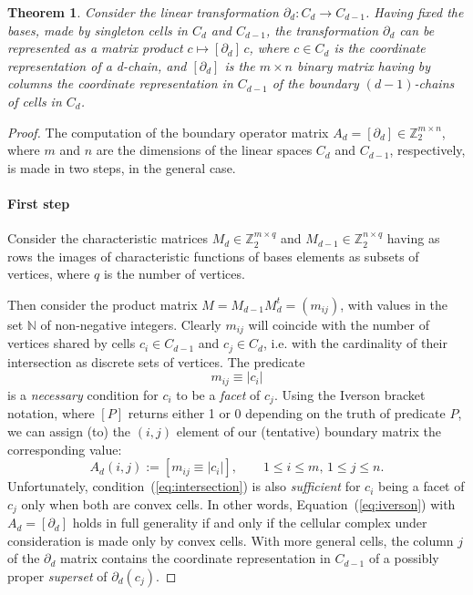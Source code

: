 \documentclass[11pt,oneside]{article}    %
\newtheorem{theorem}{Theorem}
\def\N{\mathbb{N}}
\def\Z{\mathbb{Z}}
\begin{document}
\begin{theorem}
Consider the linear transformation $\partial_d: C_d \to C_{d-1}$. Having fixed the bases, made by singleton cells in $C_d$ and $C_{d-1}$, the transformation $\partial_d$ can be represented as a matrix product ${c} \mapsto [\partial_d]\, {c}$, where ${c}\in C_d$ is the coordinate representation of a d-chain, and $[\partial_d]$ is the $m\times n$ binary matrix having \emph{by columns} the coordinate representation in $C_{d-1}$ of the boundary $(d-1)$-chains of cells in $C_{d}$.
\end{theorem}

\begin{proof}
The computation of the boundary operator matrix $A_d = [\partial_d] \in\Z_2^{m\times n}$, where $m$ and $n$ are the dimensions of the linear spaces $C_d$ and $C_{d-1}$, respectively, is made in two steps, in the general case.

\paragraph{First step} 
Consider the characteristic matrices $M_d\in\Z_2^{m\times q}$ and $M_{d-1}\in\Z_2^{n\times q}$ having as rows the images of characteristic functions of bases elements as subsets of vertices, where $q$ is the number of vertices.

Then consider the product matrix $M=M_{d-1}M_{d}^t=(m_{ij})$, with values in the set $\N$ of non-negative integers. Clearly $m_{ij}$ will coincide with the number of vertices shared by cells $c_i\in C_{d-1}$ and $c_j\in C_d$, i.e. with the cardinality of their intersection as discrete sets of vertices. The predicate 
\begin{equation}
m_{ij} \equiv |c_i|
\label{eq:intersection}
\end{equation}
is a \emph{necessary} condition for $c_i$ to be a \emph{facet} of $c_j$. Using the Iverson bracket notation, where $[P]$ returns either 1 or 0 depending on the truth of predicate $P$, we can  assign (to) the $(i,j)$ element of our (tentative) boundary matrix the corresponding value:
\begin{equation}
A_d(i,j) := [m_{ij} \equiv |c_i|], \qquad 1\leq i\leq m,\, 1\leq j\leq n.
\label{eq:iverson}
\end{equation}
Unfortunately, condition~(\ref{eq:intersection}) is also \emph{sufficient} for $c_i$ being a facet of $c_j$ only when both are convex cells. In other words, Equation~(\ref{eq:iverson}) with $A_d=[\partial_d]$ holds in full generality if and only if the cellular complex under consideration is made only by convex cells. With more general cells, the column $j$ of the $\partial_d$ matrix contains the coordinate representation in $C_{d-1}$ of a possibly proper \emph{superset}  of $\partial_d(c_j)$.


\end{proof}
\end{document}
